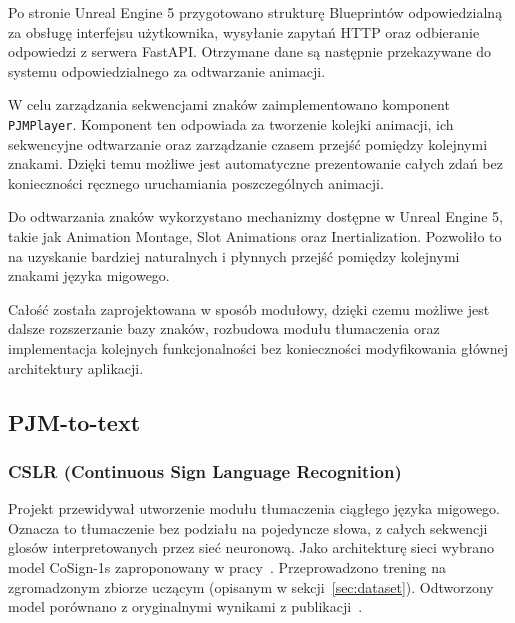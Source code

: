 \documentclass[12pt]{article}
\begin{document}
Po stronie Unreal Engine 5 przygotowano strukturę Blueprintów odpowiedzialną za obsługę interfejsu użytkownika, wysyłanie zapytań HTTP oraz odbieranie odpowiedzi z serwera FastAPI. Otrzymane dane są następnie przekazywane do systemu odpowiedzialnego za odtwarzanie animacji.

W celu zarządzania sekwencjami znaków zaimplementowano komponent \texttt{PJMPlayer}. Komponent ten odpowiada za tworzenie kolejki animacji, ich sekwencyjne odtwarzanie oraz zarządzanie czasem przejść pomiędzy kolejnymi znakami. Dzięki temu możliwe jest automatyczne prezentowanie całych zdań bez konieczności ręcznego uruchamiania poszczególnych animacji.
 
Do odtwarzania znaków wykorzystano mechanizmy dostępne w Unreal Engine 5, takie jak Animation Montage, Slot Animations oraz Inertialization. Pozwoliło to na uzyskanie bardziej naturalnych i płynnych przejść pomiędzy kolejnymi znakami języka migowego.

Całość została zaprojektowana w sposób modułowy, dzięki czemu możliwe jest dalsze rozszerzanie bazy znaków, rozbudowa modułu tłumaczenia oraz implementacja kolejnych funkcjonalności bez konieczności modyfikowania głównej architektury aplikacji.

\subsection{PJM-to-text}

\subsubsection{CSLR (Continuous Sign Language Recognition)}
Projekt przewidywał utworzenie modułu tłumaczenia ciągłego języka migowego. Oznacza to tłumaczenie bez podziału na pojedyncze słowa, z całych sekwencji glosów interpretowanych przez sieć neuronową. Jako architekturę sieci wybrano model CoSign-1s zaproponowany w pracy~\cite{cosign}. Przeprowadzono trening na zgromadzonym zbiorze uczącym (opisanym w sekcji~\ref{sec:dataset}). Odtworzony model porównano z oryginalnymi wynikami z publikacji~\cite{cosign}.

\end{document}

